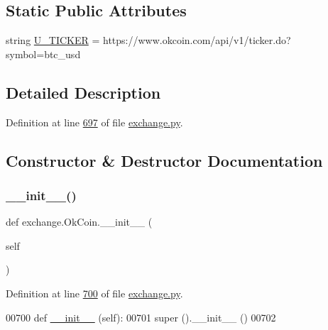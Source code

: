 \subsection*{Static Public Attributes}
\begin{DoxyCompactItemize}
\item 
string \hyperlink{classexchange_1_1_ok_coin_a81305ced2eb23b94feb7195d1d42afc2}{U\+\_\+\+T\+I\+C\+K\+ER} = \textquotesingle{}https\+://www.\+okcoin.\+com/api/v1/ticker.\+do?symbol=btc\+\_\+usd\textquotesingle{}
\end{DoxyCompactItemize}


\subsection{Detailed Description}


Definition at line \hyperlink{exchange_8py_source_l00697}{697} of file \hyperlink{exchange_8py_source}{exchange.\+py}.



\subsection{Constructor \& Destructor Documentation}
\mbox{\label{classexchange_1_1_ok_coin_ad3023a05231b37239fc5e2b220e2ae4c}} 
\subsubsection{\texorpdfstring{\+\_\+\+\_\+init\+\_\+\+\_\+()}{\_\_init\_\_()}}
{\footnotesize\ttfamily def exchange.\+Ok\+Coin.\+\_\+\+\_\+init\+\_\+\+\_\+ (\begin{DoxyParamCaption}\item[{}]{self }\end{DoxyParamCaption})}



Definition at line \hyperlink{exchange_8py_source_l00700}{700} of file \hyperlink{exchange_8py_source}{exchange.\+py}.


\begin{DoxyCode}
00700     \textcolor{keyword}{def }\hyperlink{namespacestart__time_a9c9bd378729a13c96a22c8b079ea172c}{\_\_init\_\_} (self):
00701         super ().\_\_init\_\_ ()
00702         
\end{DoxyCode}


